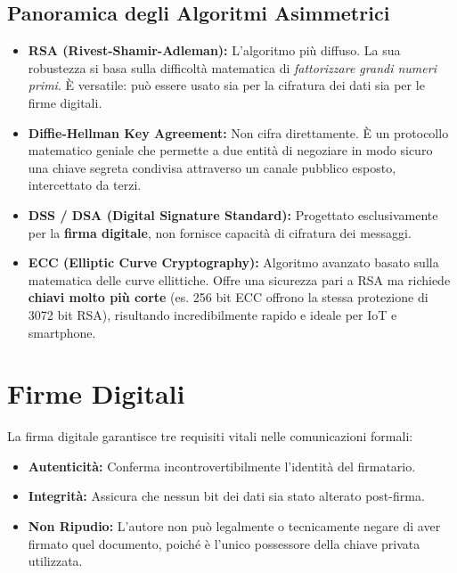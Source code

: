 \subsection{Panoramica degli Algoritmi Asimmetrici}
\begin{itemize}
    \item \textbf{RSA (Rivest-Shamir-Adleman):} L'algoritmo più diffuso. La sua robustezza si basa sulla difficoltà matematica di \textit{fattorizzare grandi numeri primi}. È versatile: può essere usato sia per la cifratura dei dati sia per le firme digitali.
    \item \textbf{Diffie-Hellman Key Agreement:} Non cifra direttamente. È un protocollo matematico geniale che permette a due entità di negoziare in modo sicuro una chiave segreta condivisa attraverso un canale pubblico esposto, intercettato da terzi.
    \item \textbf{DSS / DSA (Digital Signature Standard):} Progettato esclusivamente per la \textbf{firma digitale}, non fornisce capacità di cifratura dei messaggi.
    \item \textbf{ECC (Elliptic Curve Cryptography):} Algoritmo avanzato basato sulla matematica delle curve ellittiche. Offre una sicurezza pari a RSA ma richiede \textbf{chiavi molto più corte} (es. 256 bit ECC offrono la stessa protezione di 3072 bit RSA), risultando incredibilmente rapido e ideale per IoT e smartphone.
\end{itemize}

\section{Firme Digitali}
La firma digitale garantisce tre requisiti vitali nelle comunicazioni formali:
\begin{itemize}
    \item \textbf{Autenticità:} Conferma incontrovertibilmente l'identità del firmatario.
    \item \textbf{Integrità:} Assicura che nessun bit dei dati sia stato alterato post-firma.
    \item \textbf{Non Ripudio:} L'autore non può legalmente o tecnicamente negare di aver firmato quel documento, poiché è l'unico possessore della chiave privata utilizzata.
\end{itemize}

